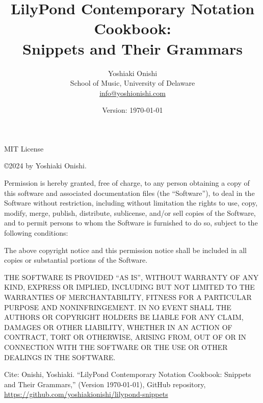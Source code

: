 \documentclass[11pt, oneside]{book}   	%
\title{LilyPond Contemporary Notation Cookbook: \\ Snippets and Their Grammars}
\author{Yoshiaki Onishi\\School of Music, University of Delaware \\ \href{mailto:info@yoshionishi.com}{info@yoshionishi.com}}
\date{Version: \today}
\begin{document}
\maketitle


MIT License

\copyright 2024 by Yoshiaki Onishi. 

Permission is hereby granted, free of charge, to any person obtaining a copy of this software and associated documentation files (the “Software”), to deal in the Software without restriction, including without limitation the rights to use, copy, modify, merge, publish, distribute, sublicense, and/or sell copies of the Software, and to permit persons to whom the Software is furnished to do so, subject to the following conditions:

The above copyright notice and this permission notice shall be included in all copies or substantial portions of the Software.

THE SOFTWARE IS PROVIDED “AS IS”, WITHOUT WARRANTY OF ANY KIND, EXPRESS OR IMPLIED, INCLUDING BUT NOT LIMITED TO THE WARRANTIES OF MERCHANTABILITY, FITNESS FOR A PARTICULAR PURPOSE AND NONINFRINGEMENT. IN NO EVENT SHALL THE AUTHORS OR COPYRIGHT HOLDERS BE LIABLE FOR ANY CLAIM, DAMAGES OR OTHER LIABILITY, WHETHER IN AN ACTION OF CONTRACT, TORT OR OTHERWISE, ARISING FROM, OUT OF OR IN CONNECTION WITH THE SOFTWARE OR THE USE OR OTHER DEALINGS IN THE SOFTWARE.

\hfill \break
Cite: Onishi, Yoshiaki. “LilyPond Contemporary Notation Cookbook: Snippets and Their Grammars,” (Version \today), GitHub repository, \href{https://github.com/yoshiakionishi/lilypond-snippets}{https://github.com/yoshiakionishi/lilypond-snippets} %


\frontmatter
\tableofcontents
\label{sec:toc}





\mainmatter










\end{document}
